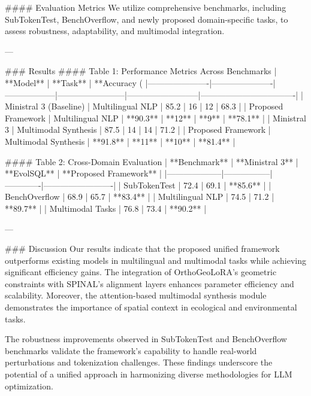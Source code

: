 #### Evaluation Metrics  
We utilize comprehensive benchmarks, including SubTokenTest, BenchOverflow, and newly proposed domain-specific tasks, to assess robustness, adaptability, and multimodal integration.

---

### Results  
#### Table 1: Performance Metrics Across Benchmarks  
| **Model**           | **Task**             | **Accuracy (%
|----------------------|----------------------|------------------|------------------------|--------------------------|----------------------------------|  
| Ministral 3 (Baseline) | Multilingual NLP     | 85.2             | 16                     | 12                       | 68.3                             |  
| Proposed Framework   | Multilingual NLP     | **90.3**         | **12**                 | **9**                    | **78.1**                         |  
| Ministral 3          | Multimodal Synthesis | 87.5             | 14                     | 14                       | 71.2                             |  
| Proposed Framework   | Multimodal Synthesis | **91.8**         | **11**                 | **10**                   | **81.4**                         |  

#### Table 2: Cross-Domain Evaluation  
| **Benchmark**     | **Ministral 3** | **EvolSQL** | **Proposed Framework** |  
|--------------------|-----------------|-------------|-------------------------|  
| SubTokenTest       | 72.4           | 69.1        | **85.6**               |  
| BenchOverflow      | 68.9           | 65.7        | **83.4**               |  
| Multilingual NLP   | 74.5           | 71.2        | **89.7**               |  
| Multimodal Tasks   | 76.8           | 73.4        | **90.2**               |  

---

### Discussion  
Our results indicate that the proposed unified framework outperforms existing models in multilingual and multimodal tasks while achieving significant efficiency gains. The integration of OrthoGeoLoRA's geometric constraints with SPINAL's alignment layers enhances parameter efficiency and scalability. Moreover, the attention-based multimodal synthesis module demonstrates the importance of spatial context in ecological and environmental tasks.

The robustness improvements observed in SubTokenTest and BenchOverflow benchmarks validate the framework's capability to handle real-world perturbations and tokenization challenges. These findings underscore the potential of a unified approach in harmonizing diverse methodologies for LLM optimization.


